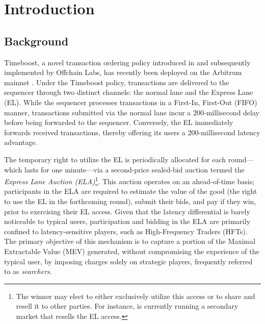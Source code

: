 \section{Introduction}
\subsection{Background}
Timeboost, a novel transaction ordering policy introduced in \cite{mamageishvili2023buying} and subsequently implemented by Offchain Labs, has recently been deployed on the Arbitrum mainnet \cite{offchainlabs2025timeboost}. Under the Timeboost policy, transactions are delivered to the sequencer through two distinct channels: the normal lane and the Express Lane (EL). While the sequencer processes transactions in a First-In, First-Out (FIFO) manner, transactions submitted via the normal lane incur a $200$-millisecond delay before being forwarded to the sequencer. Conversely, the EL immediately forwards received transactions, thereby offering its users a $200$-millisecond latency advantage.

The temporary right to utilize the EL is periodically allocated for each round—which lasts for one minute—via a second-price sealed-bid auction termed the \emph{Express Lane Auction (ELA)}\footnote{The winner may elect to either exclusively utilize this access or to share and resell it to other parties. For instance, \cite{kairossubauction} is currently running a secondary market that resells the EL access.}. This auction operates on an ahead-of-time basis; participants in the ELA are required to estimate the value of the good (the right to use the EL in the forthcoming round), submit their bids, and pay if they win, prior to exercising their EL access. Given that the latency differential is barely noticeable to typical users, participation and bidding in the ELA are primarily confined to latency-sensitive players, such as High-Frequency Traders (HFTs). The primary objective of this mechanism is to capture a portion of the Maximal Extractable Value (MEV) generated, without compromising the experience of the typical user, by imposing charges solely on strategic players, frequently referred to as \emph{searchers}. 

